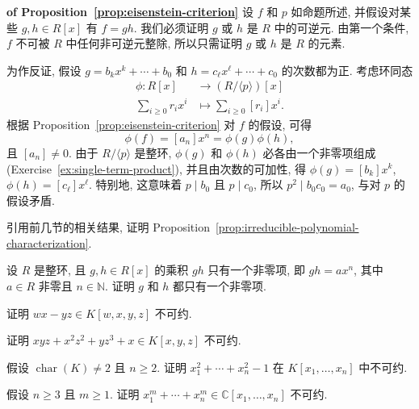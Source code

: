 \begin{Proof}\unskip\textbf{ of Proposition~\ref{prop:eisenstein-criterion}}\quad
  设 $f$ 和 $p$ 如命题所述, 并假设对某些 $g,h\in R[x]$ 有 $f=gh$. 我们必须证明 $g$ 或 $h$ 是 $R$ 中的可逆元. 由第一个条件, $f$ 不可被 $R$ 中任何非可逆元整除, 所以只需证明 $g$ 或 $h$ 是 $R$ 的元素.

  为作反证, 假设 $g=b_{k}x^{k}+\cdots+b_{0}$ 和 $h=c_{\ell}x^{\ell}+\cdots+c_{0}$ 的次数都为正. 考虑环同态
  \[
    \begin{aligned}
      \phi:R[x]&\to(R/\langle p\rangle)[x]\\
      \sum_{i\ge0}r_{i}x^{i}&\mapsto\sum_{i\ge0}[r_{i}]x^{i}.
    \end{aligned}
  \]
  根据 Proposition~\ref{prop:eisenstein-criterion} 对 $f$ 的假设, 可得
  \[
    \phi(f)=[a_{n}]x^{n}=\phi(g)\phi(h),
  \]
  且 $[a_{n}]\ne0$. 由于 $R/\langle p\rangle$ 是整环, $\phi(g)$ 和 $\phi(h)$ 必各由一个非零项组成 (Exercise~\ref{ex:single-term-product}), 并且由次数的可加性, 得 $\phi(g)=[b_{k}]x^{k}$, $\phi(h)=[c_{\ell}]x^{\ell}$. 特别地, 这意味着 $p\mid b_{0}$ 且 $p\mid c_{0}$, 所以 $p^{2}\mid b_{0}c_{0}=a_{0}$, 与对 $p$ 的假设矛盾.
\end{Proof}

\BookExerciseHeading
\begin{BookExercises}
  \item\label{ex:irreducible-criteria-equivalence} 引用前几节的相关结果, 证明 Proposition~\ref{prop:irreducible-polynomial-characterization}.
  \item\label{ex:single-term-product} 设 $R$ 是整环, 且 $g,h\in R[x]$ 的乘积 $gh$ 只有一个非零项, 即 $gh=ax^{n}$, 其中 $a\in R$ 非零且 $n\in\mathbb{N}$. 证明 $g$ 和 $h$ 都只有一个非零项.
  \item\label{ex:determinant-two-by-two-irreducible} 证明 $wx-yz\in K[w,x,y,z]$ 不可约.
  \item\label{ex:mixed-cubic-polynomial-irreducible} 证明 $xyz+x^{2}z^{2}+yz^{3}+x\in K[x,y,z]$ 不可约.
  \item\label{ex:quadratic-sphere-any-dimension-irreducible} 假设 $\operatorname{char}(K)\ne2$ 且 $n\ge2$. 证明 $x_{1}^{2}+\cdots+x_{n}^{2}-1$ 在 $K[x_{1},\ldots,x_{n}]$ 中不可约.
  \item\label{ex:fermat-polynomial-irreducible} 假设 $n\ge3$ 且 $m\ge1$. 证明 $x_{1}^{m}+\cdots+x_{n}^{m}\in\mathbb{C}[x_{1},\ldots,x_{n}]$ 不可约.
\end{BookExercises}

